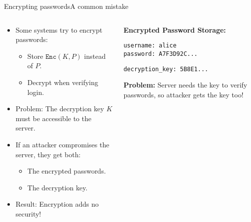 \documentclass[aspectratio=169, lualatex, handout]{beamer}
\begin{document}
\begin{frame}{Encrypting passwords}{A common mistake}
	\begin{columns}[c]
		\begin{column}{0.55\textwidth}
			\begin{itemize}
				\item Some systems try to encrypt passwords:
				      \begin{itemize}
					      \item Store $\texttt{Enc}(K, P)$ instead of $P$.
					      \item Decrypt when verifying login.
				      \end{itemize}
				\item Problem: The decryption key $K$ must be accessible to the server.
				\item If an attacker compromises the server, they get both:
				      \begin{itemize}
					      \item The encrypted passwords.
					      \item The decryption key.
				      \end{itemize}
				\item Result: Encryption adds no security!
			\end{itemize}
		\end{column}
		\begin{column}{0.45\textwidth}
			\begin{tcolorbox}[colback=black!5!white,colframe=ciphergray]
				\textbf{Encrypted Password Storage:}

				\vspace{0.2cm}

				\texttt{username: alice}\\
				\texttt{password: A7F3D92C...}

				\vspace{0.2cm}

				\texttt{decryption\_key: 5B8E1...}

				\vspace{0.3cm}

				\textcolor{cipherprimary}{\textbf{Problem:} \small Server needs the key to verify passwords, so attacker gets the key too!}
			\end{tcolorbox}
		\end{column}
	\end{columns}
\end{frame}
\end{document}
